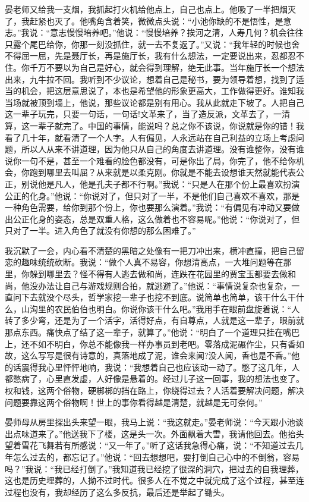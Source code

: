 \documentclass[12pt,oneside]{book}
\begin{document}
晏老师又给我一支烟，我抓起打火机给他点上，自己也点上。他吸了一半把烟灭了，我赶紧也灭了。他嘴角含着笑，微微点头说：``小池你缺的不是悟性，是意志。''我说：``意志慢慢培养吧。''他说：``慢慢培养？挨河之清，人寿几何？机会往往只露个尾巴给你，你那一刻没抓住，就一去不复返了。''又说：``我年轻的时候也舍不得屈一屈，先是聂厅长，再是施厅长，我有什么想法，一定要说出来，忍都忍不住。你千万不要以为自己是好心，就会得到理解，绝无此事。当年施厅长一个想法出来，九牛拉不回。我听到不少议论，想着自己是秘书，要为领导着想，找到了适当的机会，把这层意思说了，本也是希望他的形象更高大，工作做得更好。谁知我当场就被顶到墙上，他说，那些议论都是别有用心。我从此就走下坡了。人把自己这一辈子玩完，只要一句话，一句话!文革来了，当了造反派，文革去了，一清算，这一辈子就完了。中国的事情，能说吗？总之你不该说，你说就是你的错！我看了几十年，就看清了一个人字。人有偏见，人永远站在自己利益的立场上考虑问题，所以人从来不讲道理，因为他只从自己的角度去讲道理。没有谁整你，没有谁说你一句不是，甚至一个难看的脸色都没有，可是你出了局，你完了，他不给你机会，你跑到哪里去叫屈？从来就是以柔克刚。你就是不能去设想谁天然就能代表公正，别说他是凡人，他是孔夫子都不行啊。''我说：``只是人在那个份上最喜欢扮演公正的化身。''他说：``你说对了，但只对了一半，不是他们自己喜欢不喜欢，那是一种角色需要，给你到那个份上，你也要那么演着。''我说：``有偏见有冲动又要做出公正化身的姿态，总是双重人格，这么做着也不容易呢。''他说：``你说对了，但只对了一半。进入角色了就没有你想的那么困难了。''

我沉默了一会，内心看不清楚的黑暗之处像有一把刀冲出来，横冲直撞，把自己留恋的趣味统统砍断。我说：``做个人真不易容，你想清高点，一大堆问题等在那里，你躲到哪里去？怪不得有人逃去做和尚，连跌在花园里的贾宝玉都要去做和尚，他没办法让自己与游戏规则合拍，就逃避了。''他说：``事情说复杂也复杂，一直问下去就没个尽头，哲学家挖一辈子也挖不到底。说简单也简单，该干什么干什么，山沟里的农民伯伯也明白。你说你该干什么吧。''我用手在眼前盘旋着说：``人转了多少弯，还是为了一个活字，活得好点，有自尊点，人就是这一辈子，眼前就那点东西。痛快点了结了这一辈子，就算了。''他说：``明白了一个道理只挂在嘴巴上，还不如不明白，你总不能像我一样办事员到老吧。零落成泥碾作尘，只有香如故，这么写写是很有诗意的，真落地成了泥，谁会来闻?没人闻，香也是不香。''他的话震得我心里怦怦地响，我说：``我想着自己也应该动一动了。憋了这几年，人都憋病了，心里直发虚，人好像是悬着的。经过儿子这一回事，我的想法也变了。权和钱，这两个俗物，硬梆梆的挡在路上，你绕得过去？人活着要解决问题，解决问题要靠这两个俗物啊！世上的事你看得越是清楚，就越是无可奈何。''

晏师母从房里探出头来望一眼，我马上说：``我这就走。''晏老师说：``今天跟小池谈出点味道来了。''他送我下了楼，这是头一次。外面飘着大雪，我请他回去。他抬头望着雪花飞舞若有所感说：``又一年了。''听了这话我急得心痛，说：``不知道过去几年怎么过去的，都忘记了。''他说：``回去想想吧，要打倒自己心中的不倒翁，容易吗？''我说：``我已经打倒了。''我知道我已经挖了很深的洞穴，把过去的自我理葬，这也是历史埋葬的，人拗不过时代。很多人在不觉之中就完成了这个过程，甚至连过程也没有，我却经历了这么多反抗，最后还是举起了锄头。
\end{document}
